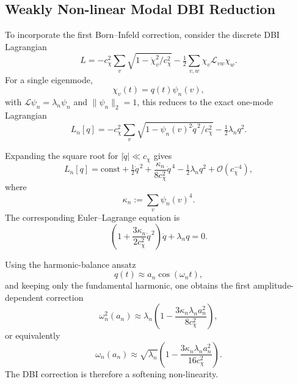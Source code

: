 \subsection{Weakly Non-linear Modal DBI Reduction}
  \label{subsec:weakly-nonlinear-dbi-reduction}

  To incorporate the first Born--Infeld correction, consider the discrete DBI Lagrangian
  \begin{equation}
    \label{eq:dbi-lagrangian}
    L
    =
    -c_\chi^2 \sum_v \sqrt{1 - \dot{\chi}_v^2/c_\chi^2}
    - \tfrac{1}{2} \sum_{v,w} \chi_v \mathcal{L}_{vw} \chi_w.
  \end{equation}
  For a single eigenmode,
  \begin{equation}
    \chi_v(t) = q(t)\psi_n(v),
  \end{equation}
  with $\mathcal{L}\psi_n = \lambda_n \psi_n$ and $\|\psi_n\|_2 = 1$, this reduces to
  the exact one-mode Lagrangian
  \begin{equation}
    \label{eq:exact-mode-lagrangian}
    L_n[q]
    =
    -c_\chi^2 \sum_v \sqrt{1 - \psi_n(v)^2 \dot{q}^{\,2}/c_\chi^2}
    - \tfrac{1}{2}\lambda_n q^2.
  \end{equation}

  Expanding the square root for $|\dot{q}| \ll c_\chi$ gives
  \begin{equation}
    \label{eq:mode-lagrangian-expansion}
    L_n[q]
    =
    \mathrm{const}
    + \tfrac{1}{2}\dot{q}^{\,2}
    + \frac{\kappa_n}{8c_\chi^2}\dot{q}^{\,4}
    - \tfrac{1}{2}\lambda_n q^2
    + \mathcal{O}(c_\chi^{-4}),
  \end{equation}
  where
  \begin{equation}
    \label{eq:kappa-def}
    \kappa_n := \sum_v \psi_n(v)^4.
  \end{equation}
  The corresponding Euler--Lagrange equation is
  \begin{equation}
    \label{eq:weakly-nonlinear-mode-equation}
    \left(
      1 + \frac{3\kappa_n}{2c_\chi^2}\dot{q}^{\,2}
    \right)\ddot{q}
    + \lambda_n q
    = 0.
  \end{equation}

  Using the harmonic-balance ansatz
  \begin{equation}
    q(t) \approx a_n \cos(\omega_n t),
  \end{equation}
  and keeping only the fundamental harmonic, one obtains the first
  amplitude-dependent correction
  \begin{equation}
    \label{eq:omega-shift-square}
    \omega_n^2(a_n)
    \approx
    \lambda_n
    \left(
      1 - \frac{3\kappa_n\lambda_n a_n^2}{8c_\chi^2}
    \right),
  \end{equation}
  or equivalently
  \begin{equation}
    \label{eq:omega-shift}
    \omega_n(a_n)
    \approx
    \sqrt{\lambda_n}
    \left(
      1 - \frac{3\kappa_n\lambda_n a_n^2}{16c_\chi^2}
    \right).
  \end{equation}
  The DBI correction is therefore a softening non-linearity.


